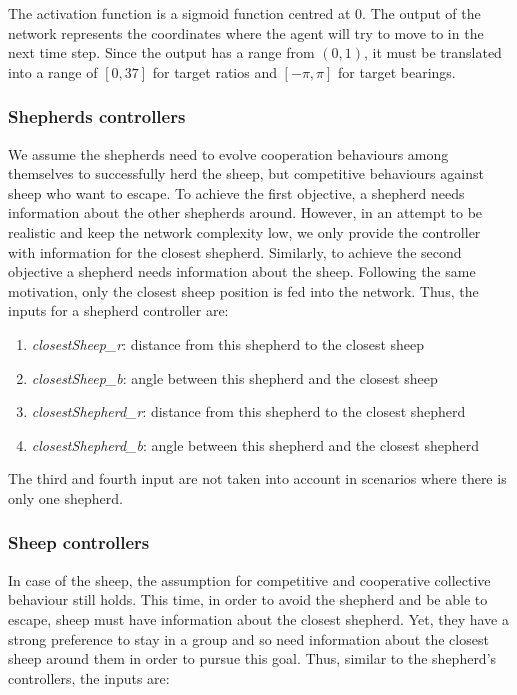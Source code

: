 \documentclass[conference]{IEEEtran}
\begin{document}
The activation function is a sigmoid function centred at 0. 
The output of the network represents the coordinates where the agent will try to move to in the next time step. 
Since the output has a range from $(0, 1)$, it must be translated into a range of $[0, 37]$ for target ratios and $[-\pi, \pi]$ for target bearings. 
 
\subsubsection{Shepherds controllers}
We assume the shepherds need to evolve cooperation behaviours among themselves to successfully herd the sheep, but competitive behaviours against sheep who want to escape. To achieve the first objective, a shepherd needs information about the other shepherds around. However, in an attempt to be realistic and keep the network complexity low, we only provide the controller with information for the closest shepherd. Similarly, to achieve the second objective a shepherd needs information about the sheep. Following the same motivation, only the closest sheep position is fed into the network. Thus, the inputs for a shepherd controller are: 

\begin{enumerate}
	\item \textit{closestSheep\_r}: distance from this shepherd to the closest sheep
	\item \textit{closestSheep\_b}: angle between this shepherd and the closest sheep 
	\item \textit{closestShepherd\_r}: distance from this shepherd to the closest shepherd
	\item \textit{closestShepherd\_b}: angle between this shepherd and the closest shepherd
\end{enumerate}

The third and fourth input are not taken into account in scenarios where there is only one shepherd. 

\subsubsection{Sheep controllers}
In case of the sheep, the assumption for competitive and cooperative collective behaviour still holds. This time, in order to avoid the shepherd and be able to escape, sheep must have information about the closest shepherd. Yet, they have a strong preference to stay in a group and so need information about the closest sheep around them in order to pursue this goal. Thus, similar to the shepherd's controllers, the inputs are:
\end{document}
